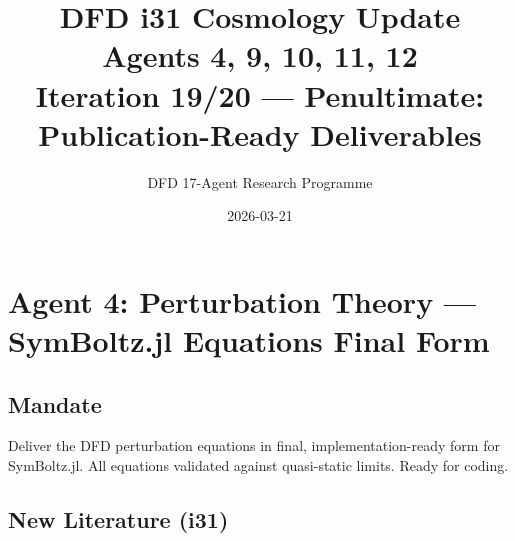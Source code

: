 \documentclass[11pt,a4paper]{article}
\title{DFD i31 Cosmology Update\\Agents 4, 9, 10, 11, 12\\[6pt]\large Iteration 19/20 --- Penultimate: Publication-Ready Deliverables}
\author{DFD 17-Agent Research Programme}
\date{2026-03-21}
\begin{document}
\maketitle
\tableofcontents
\newpage

\section{Agent 4: Perturbation Theory --- SymBoltz.jl Equations Final Form}

\subsection{Mandate}
Deliver the DFD perturbation equations in final, implementation-ready form for SymBoltz.jl. All equations validated against quasi-static limits. Ready for coding.

\subsection{New Literature (i31)}
\end{document}
